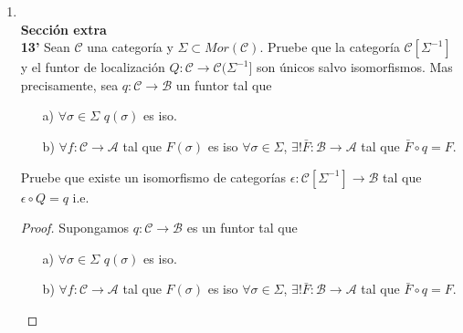 \documentclass{article}
\begin{document}
\begin{enumerate}
\begin{proof}
\begin{enumerate}
Adem\'as para cualquier $\theta : \xymatrix{X\ar[r]^u & Y\ar[r]^v & Z\ar[r]^w & TX } \in \mathcal{T}(\mathscr{C}_{1},T_{1})$ se cumple que:

\begin{align*}
\bar{F}(1_{\theta}) =& \bar{F}(1_{X},1_{Y},1_{Z})\\
=& ( F(1_{X}),F(1_{Y}),F(1_{Z}) )\\
=& (1_{FX},1_{FY},1_{FZ})\\
=& 1_{\bar{F}(\theta)}.
\end{align*}

Se puede concluir que $\bar{F}:\mathcal{T}(\mathscr{C}_{1},T_{1})\to \mathcal{T}(\mathscr{C}_{2},T_{2})$ es un funtor.

\end{enumerate}
\end{proof}

\item 
\,\\

\textbf{Sección extra}\\

\textbf{13'} Sean $\mathscr{C}$ una categoría y $\Sigma\subset Mor(\mathscr{C})$. Pruebe que la categoría $\mathscr{C}[\Sigma^{-1}]$ y el 
funtor de localización $Q:\mathscr{C}\rightarrow \mathscr{C}(\Sigma^{-1}]$ son únicos salvo isomorfismos. Mas precisamente, sea $q:\mathscr{C}
\rightarrow \mathscr{B}$ un funtor tal que 
\begin{itemize}
\item[a)] $\forall \sigma\in \Sigma$ \quad $q(\sigma)$ es iso.
\item[b)] $\forall f:\mathscr{C}\to \mathscr{A}$ tal que $F(\sigma)$ es iso $\forall \sigma\in \Sigma$, $\exists ! \bar{F}:\mathscr{B}\to\mathscr{A}$
tal que $\bar{F}\circ q=F$.\\
\end{itemize}
Pruebe que existe un isomorfismo de categorías $\epsilon:\mathscr{C}[\Sigma^{-1}]\to \mathscr{B}$ tal que \\$\epsilon\circ Q=q$ \quad i.e. \\
\centerline{
}
\begin{proof}
Supongamos $q:\mathscr{C}\to \mathscr{B}$ es un funtor tal que 
\begin{itemize}
\item[a)] $\forall \sigma\in \Sigma$ \quad $q(\sigma)$ es iso.
\item[b)] $\forall f:\mathscr{C}\to \mathscr{A}$ tal que $F(\sigma)$ es iso $\forall \sigma\in \Sigma$, $\exists ! \bar{F}:\mathscr{B}\to\mathscr{A}$
tal que $\bar{F}\circ q=F$.\\
\end{itemize}


\end{proof}
\end{enumerate}
\end{document}
